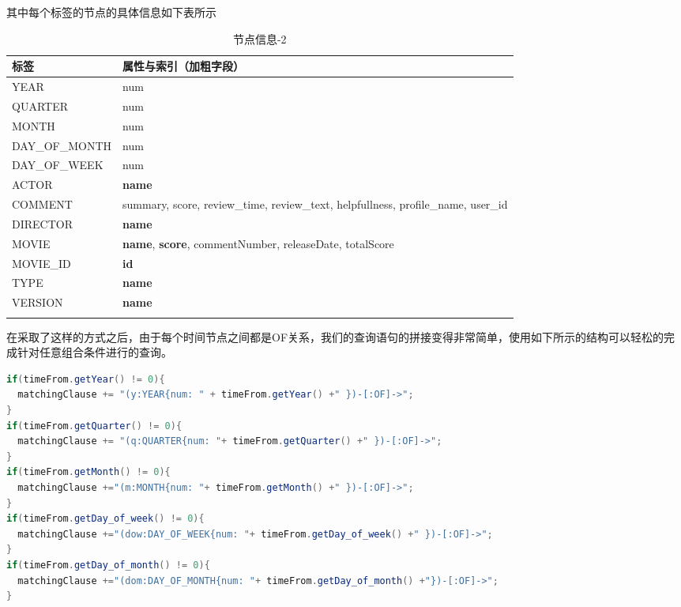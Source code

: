 \documentclass{ctexrep}
\begin{document}
	其中每个标签的节点的具体信息如下表所示\begin{longtable}{l|p{8cm}}
		\hline
		标签 & 属性与索引（加粗字段）  \\
		\hline
		\hline
		YEAR & num\\
		QUARTER & num \\
		MONTH & num\\
		DAY\_OF\_MONTH & num\\
		DAY\_OF\_WEEK & num \\
		\hline
		ACTOR & \textbf{name} \\
		COMMENT & summary, score, review\_time, review\_text, helpfullness, profile\_name, user\_id \\
		DIRECTOR & \textbf{name}\\
		MOVIE & \textbf{name}, \textbf{score}, commentNumber, releaseDate, totalScore \\
		MOVIE\_ID & \textbf{id} \\
		TYPE & \textbf{name}\\
		VERSION & \textbf{name}\\
		\hline
		\caption{节点信息-2}
		\end{longtable}
	在采取了这样的方式之后，由于每个时间节点之间都是OF关系，我们的查询语句的拼接变得非常简单，使用如下所示的结构可以轻松的完成针对任意组合条件进行的查询。\begin{lstlisting}[language=java]
if(timeFrom.getYear() != 0){
  matchingClause += "(y:YEAR{num: " + timeFrom.getYear() +" })-[:OF]->";
}
if(timeFrom.getQuarter() != 0){
  matchingClause += "(q:QUARTER{num: "+ timeFrom.getQuarter() +" })-[:OF]->";
}
if(timeFrom.getMonth() != 0){
  matchingClause +="(m:MONTH{num: "+ timeFrom.getMonth() +" })-[:OF]->";
}
if(timeFrom.getDay_of_week() != 0){
  matchingClause +="(dow:DAY_OF_WEEK{num: "+ timeFrom.getDay_of_week() +" })-[:OF]->";
}
if(timeFrom.getDay_of_month() != 0){
  matchingClause +="(dom:DAY_OF_MONTH{num: "+ timeFrom.getDay_of_month() +"})-[:OF]->";
}
	\end{lstlisting}
	
\end{document}
